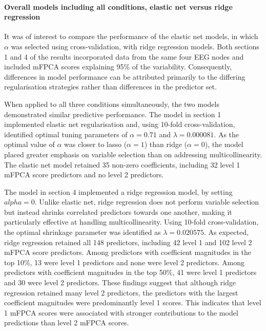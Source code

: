 \documentclass{article}
\begin{document}
\paragraph{Overall models including all conditions, elastic net versus
ridge
regression}\label{overall-models-including-all-conditions-elastic-net-versus-ridge-regression}

It was of interest to compare the performance of the elastic net models,
in which \(\alpha\) was selected using cross-validation, with ridge
regression models. Both sections 1 and 4 of the results incorporated
data from the same four EEG nodes and included mFPCA scores explaining
95\% of the variability. Consequently, differences in model performance
can be attributed primarily to the differing regularisation strategies
rather than differences in the predictor set.

When applied to all three conditions simultaneously, the two models
demonstrated similar predictive performance. The model in section 1
implemented elastic net regularisation and, using 10-fold
cross-validation, identified optimal tuning parameters of
\(\alpha = 0.71\) and \(\lambda = 0.000081\). As the optimal value of
\(\alpha\) was closer to lasso (\(\alpha = 1\)) than ridge
(\(\alpha = 0\)), the model placed greater emphasis on variable
selection than on addressing multicollinearity. The elastic net model
retained 35 non-zero coefficients, including 32 level 1 mFPCA score
predictors and no level 2 predictors.

The model in section 4 implemented a ridge regression model, by setting
\(alpha = 0\). Unlike elastic net, ridge regression does not perform
variable selection but instead shrinks correlated predictors towards one
another, making it particularly effective at handling multicollinearity.
Using 10-fold cross-validation, the optimal shrinkage parameter was
identified as \(\lambda = 0.020575\). As expected, ridge regression
retained all 148 predictors, including 42 level 1 and 102 level 2 mFPCA
score predictors. Among predictors with coefficient magnitudes in the
top 10\%, 13 were level 1 predictors and none were level 2 predictors.
Among predictors with coefficient magnitudes in the top 50\%, 41 were
level 1 predictors and 30 were level 2 predictors. These findings
suggest that although ridge regression retained many level 2 predictors,
the predictors with the largest coefficient magnitudes were
predominantly level 1 scores. This indicates that level 1 mFPCA scores
were associated with stronger contributions to the model predictions
than level 2 mFPCA scores.
\end{document}
